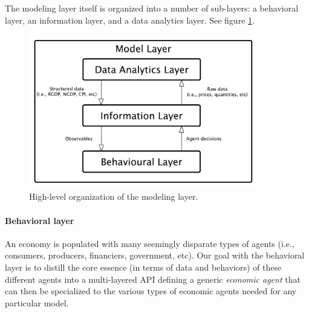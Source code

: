 \documentclass[11pt]{amsart}
\begin{document}
The modeling layer itself is organized into a number of sub-layers: a behavioral layer, an information layer, and a data analytics layer. See figure \ref{img-figure-2}.
\begin{figure}[H]\label{img-figure-2}
\centering
\includegraphics[width=10cm]{img/coarse-grain-model-layer.pdf}
\caption{High-level organization of the modeling layer.}
\end{figure}

\paragraph{Behavioral layer}
An economy is populated with many seemingly disparate types of agents (i.e., consumers, producers, financiers, government, etc).  Our goal with the behavioral layer is to distill the core essence (in terms of data and behaviors) of these different agents into a multi-layered API defining a generic \textit{economic agent} that can then be specialized to the various types of economic agents needed for any particular model.
\end{document}
